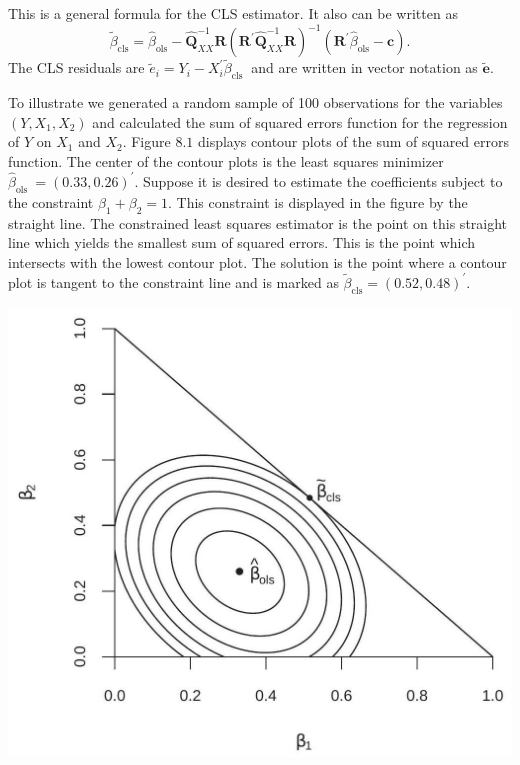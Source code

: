 \documentclass[10pt]{article}
\begin{document}
This is a general formula for the CLS estimator. It also can be written as
$$
\widetilde{\beta}_{\mathrm{cls}}=\widehat{\beta}_{\mathrm{ols}}-\widehat{\boldsymbol{Q}}_{X X}^{-1} \boldsymbol{R}\left(\boldsymbol{R}^{\prime} \widehat{\boldsymbol{Q}}_{X X}^{-1} \boldsymbol{R}\right)^{-1}\left(\boldsymbol{R}^{\prime} \widehat{\beta}_{\mathrm{ols}}-\boldsymbol{c}\right) .
$$
The CLS residuals are $\widetilde{e}_{i}=Y_{i}-X_{i}^{\prime} \widetilde{\beta}_{\text {cls }}$ and are written in vector notation as $\widetilde{\boldsymbol{e}}$.

To illustrate we generated a random sample of 100 observations for the variables $\left(Y, X_{1}, X_{2}\right)$ and calculated the sum of squared errors function for the regression of $Y$ on $X_{1}$ and $X_{2}$. Figure $8.1$ displays contour plots of the sum of squared errors function. The center of the contour plots is the least squares minimizer $\widehat{\beta}_{\text {ols }}=(0.33,0.26)^{\prime}$. Suppose it is desired to estimate the coefficients subject to the constraint $\beta_{1}+\beta_{2}=1$. This constraint is displayed in the figure by the straight line. The constrained least squares estimator is the point on this straight line which yields the smallest sum of squared errors. This is the point which intersects with the lowest contour plot. The solution is the point where a contour plot is tangent to the constraint line and is marked as $\widetilde{\beta}_{\mathrm{cls}}=(0.52,0.48)^{\prime}$.

\includegraphics[max width=\textwidth]{2022_09_17_fb390717b501da243396g-03}
\end{document}
